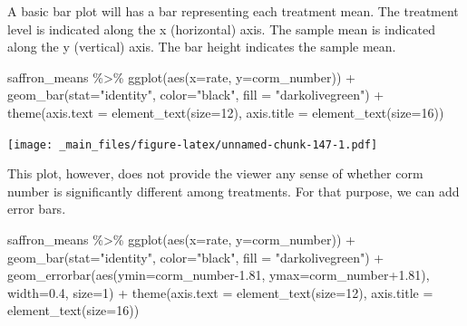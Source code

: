 \documentclass[
]{book}
\newenvironment{Shaded}{\begin{snugshade}}{\end{snugshade}}
\newcommand{\AttributeTok}[1]{\textcolor[rgb]{0.77,0.63,0.00}{#1}}
\newcommand{\DecValTok}[1]{\textcolor[rgb]{0.00,0.00,0.81}{#1}}
\newcommand{\FloatTok}[1]{\textcolor[rgb]{0.00,0.00,0.81}{#1}}
\newcommand{\FunctionTok}[1]{\textcolor[rgb]{0.00,0.00,0.00}{#1}}
\newcommand{\NormalTok}[1]{#1}
\newcommand{\SpecialCharTok}[1]{\textcolor[rgb]{0.00,0.00,0.00}{#1}}
\newcommand{\StringTok}[1]{\textcolor[rgb]{0.31,0.60,0.02}{#1}}
\begin{document}
A basic bar plot will has a bar representing each treatment mean. The treatment level is indicated along the x (horizontal) axis. The sample mean is indicated along the y (vertical) axis. The bar height indicates the sample mean.

\begin{Shaded}
\begin{Highlighting}[]
\NormalTok{saffron\_means }\SpecialCharTok{\%\textgreater{}\%}
  \FunctionTok{ggplot}\NormalTok{(}\FunctionTok{aes}\NormalTok{(}\AttributeTok{x=}\NormalTok{rate, }\AttributeTok{y=}\NormalTok{corm\_number)) }\SpecialCharTok{+}
  \FunctionTok{geom\_bar}\NormalTok{(}\AttributeTok{stat=}\StringTok{"identity"}\NormalTok{, }\AttributeTok{color=}\StringTok{"black"}\NormalTok{, }\AttributeTok{fill =} \StringTok{"darkolivegreen"}\NormalTok{) }\SpecialCharTok{+}
  \FunctionTok{theme}\NormalTok{(}\AttributeTok{axis.text =} \FunctionTok{element\_text}\NormalTok{(}\AttributeTok{size=}\DecValTok{12}\NormalTok{),}
        \AttributeTok{axis.title =} \FunctionTok{element\_text}\NormalTok{(}\AttributeTok{size=}\DecValTok{16}\NormalTok{))}
\end{Highlighting}
\end{Shaded}

\texttt{[image: \_main\_files/figure-latex/unnamed-chunk-147-1.pdf]}

This plot, however, does not provide the viewer any sense of whether corm number is significantly different among treatments. For that purpose, we can add error bars.

\begin{Shaded}
\begin{Highlighting}[]
\NormalTok{saffron\_means }\SpecialCharTok{\%\textgreater{}\%}
  \FunctionTok{ggplot}\NormalTok{(}\FunctionTok{aes}\NormalTok{(}\AttributeTok{x=}\NormalTok{rate, }\AttributeTok{y=}\NormalTok{corm\_number)) }\SpecialCharTok{+}
  \FunctionTok{geom\_bar}\NormalTok{(}\AttributeTok{stat=}\StringTok{"identity"}\NormalTok{, }\AttributeTok{color=}\StringTok{"black"}\NormalTok{, }\AttributeTok{fill =} \StringTok{"darkolivegreen"}\NormalTok{) }\SpecialCharTok{+}
  \FunctionTok{geom\_errorbar}\NormalTok{(}\FunctionTok{aes}\NormalTok{(}\AttributeTok{ymin=}\NormalTok{corm\_number}\FloatTok{{-}1.81}\NormalTok{, }\AttributeTok{ymax=}\NormalTok{corm\_number}\FloatTok{+1.81}\NormalTok{), }\AttributeTok{width=}\FloatTok{0.4}\NormalTok{, }\AttributeTok{size=}\DecValTok{1}\NormalTok{) }\SpecialCharTok{+}
  \FunctionTok{theme}\NormalTok{(}\AttributeTok{axis.text =} \FunctionTok{element\_text}\NormalTok{(}\AttributeTok{size=}\DecValTok{12}\NormalTok{),}
        \AttributeTok{axis.title =} \FunctionTok{element\_text}\NormalTok{(}\AttributeTok{size=}\DecValTok{16}\NormalTok{))}
\end{Highlighting}
\end{Shaded}
\end{document}
